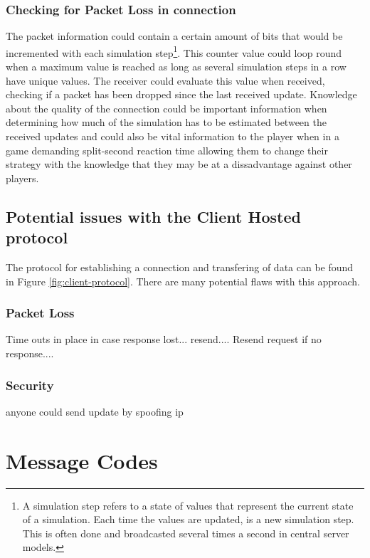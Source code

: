 \subsubsection{Checking for Packet Loss in connection}
The packet information could contain a certain amount of bits that would be incremented with each simulation step\footnote{A simulation step refers to a state of values that represent the current state of a simulation. Each time the values are updated, is a new simulation step. This is often done and broadcasted several times a second in central server models.}. This counter value could loop round when a maximum value is reached as long as several simulation steps in a row have unique values. The receiver could evaluate this value when received, checking if a packet has been dropped since the last received update. Knowledge about the quality of the connection could be important information when determining how much of the simulation has to be estimated between the received updates and could also be vital information to the player when in a game demanding split-second reaction time allowing them to change their strategy with the knowledge that they may be at a dissadvantage against other players.



\newpage



\subsection{Potential issues with the Client Hosted protocol}
The protocol for establishing a connection and transfering of data can be found in Figure \ref{fig:client-protocol}. There are many potential flaws with this approach.
\subsubsection{Packet Loss}
Time outs in place in case response lost...
resend....
Resend request if no response....


\subsubsection{Security}
anyone could send update by spoofing ip


\pagebreak
\section{Message Codes}



\pagebreak
